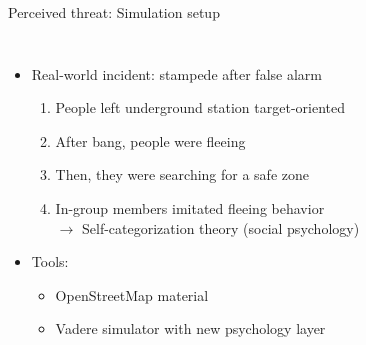 \documentclass[compress,t,usenames,xcolor=dvipsnames]{beamer}
\begin{document}
\begin{frame}{Perceived threat: Simulation setup}
    \begin{columns}[T]
        \begin{minipage}[c][0.4\textheight][t]{\textwidth}
            \begin{itemize}
                \item<1-> Real-world incident: stampede after false alarm
                \begin{enumerate}
                    \item<1-> People left underground station target-oriented
                    \item<2-> After bang, people were fleeing
                    \item<3-> Then, they were searching for a safe zone
                    \item<4->  In-group members imitated fleeing behavior \\ \(\rightarrow\) Self-categorization theory (social psychology)
                \end{enumerate}
                \item<4-> Tools:
                \begin{itemize}
                    \item<4-> OpenStreetMap material
                    \item<5-> Vadere simulator with new psychology layer
                \end{itemize}
            \end{itemize}
        \end{minipage}
        \begin{minipage}[c][0.4\textheight][t]{\textwidth}
            \centering

\end{minipage}
\end{columns}
\end{frame}
\end{document}
